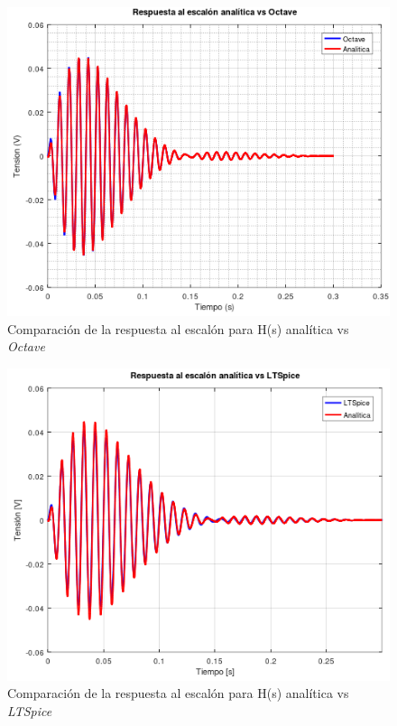 \documentclass[11pt,a4paper]{report}
\begin{document}
\begin{figure}[h!]
\centering
\includegraphics[scale=1]{rtaEscalonAnaliticaVSOctave.png}
\caption{Comparación de la respuesta al escalón para H(s) analítica vs \textit{Octave}}
\end{figure}
\clearpage

\begin{figure}[ht!]
\centering
\includegraphics[scale=1]{rtaEscalonAnaliticaVSLTSpice.png}
\caption{Comparación de la respuesta al escalón para H(s) analítica vs \textit{LTSpice}}
\end{figure}
\end{document}
